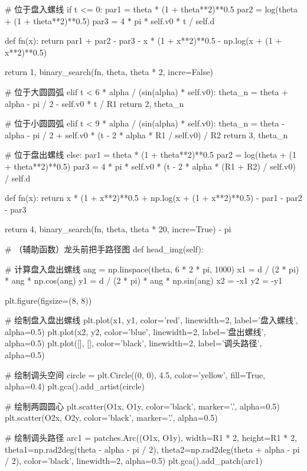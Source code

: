 \documentclass[withoutpreface,bwprint]{cumcmthesis}
\begin{document}
\begin{CodeText}
   # 位于盘入螺线
   if t <= 0:
      par1 = theta * (1 + theta**2)**0.5
      par2 = log(theta + (1 + theta**2)**0.5)
      par3 = 4 * pi * self.v0 * t / self.d

      def fn(x):
           return par1 + par2 - par3 - x * (1 + x**2)**0.5 - np.log(x + (1 + x**2)**0.5)

      return 1, binary_search(fn, theta, theta * 2, incre=False)

   # 位于大圆圆弧
   elif t < 6 * alpha / (sin(alpha) * self.v0):
      theta_n = theta + alpha - pi / 2 - self.v0 * t / R1
      return 2, theta_n

   # 位于小圆圆弧
   elif t < 9 * alpha / (sin(alpha) * self.v0):
      theta_n = theta - alpha - pi / 2 + self.v0 * (t - 2 * alpha * R1 / self.v0) / R2
      return 3, theta_n

   # 位于盘出螺线
   else:
      par1 = theta * (1 + theta**2)**0.5
      par2 = log(theta + (1 + theta**2)**0.5)
      par3 = 4 * pi * self.v0 * (t - 2 * alpha * (R1 + R2) / self.v0) / self.d


      def fn(x):
            return x * (1 + x**2)**0.5 + np.log(x + (1 + x**2)**0.5) - par1 - par2 - par3

      return 4, binary_search(fn, theta, theta * 20, incre=True) - pi

# （辅助函数）龙头前把手路径图
def head_img(self):

   # 计算盘入盘出螺线
   ang = np.linspace(theta, 6 * 2 * pi, 1000)
   x1 = d / (2 * pi) * ang * np.cos(ang)
   y1 = d / (2 * pi) * ang * np.sin(ang)
   x2 = -x1
   y2 = -y1

   plt.figure(figsize=(8, 8))

   # 绘制盘入盘出螺线
   plt.plot(x1, y1, color='red', linewidth=2, label='盘入螺线', alpha=0.5)
   plt.plot(x2, y2, color='blue', linewidth=2, label='盘出螺线', alpha=0.5)
   plt.plot([], [], color='black', linewidth=2, label='调头路径', alpha=0.5)

   # 绘制调头空间
   circle = plt.Circle((0, 0), 4.5, color='yellow', fill=True, alpha=0.4)
   plt.gca().add_artist(circle)

   # 绘制两圆圆心
   plt.scatter(O1x, O1y, color='black', marker='.', alpha=0.5)
   plt.scatter(O2x, O2y, color='black', marker='.', alpha=0.5)

   # 绘制调头路径
   arc1 = patches.Arc((O1x, O1y), width=R1 * 2, height=R1 * 2, theta1=np.rad2deg(theta -
             alpha - pi / 2), theta2=np.rad2deg(theta + alpha - pi / 2), color='black',
             linewidth=2, alpha=0.5)
   plt.gca().add_patch(arc1)


\end{CodeText}
\end{document}
